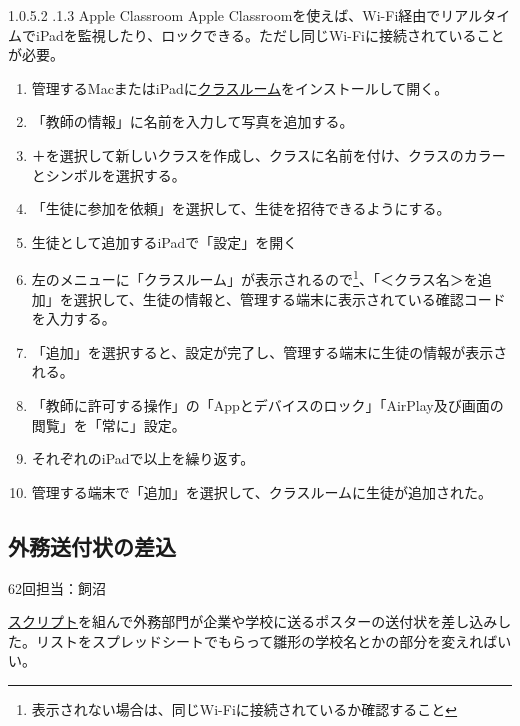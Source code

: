 \documentclass[dvipdfmx,jb5]{jarticle}
\makeatletter
\newcommand{\subsubsubsection}{\@startsection{paragraph}{4}{\z@}%
    {1.0\Cvs \@plus.5\Cdp \@minus.2\Cdp}%
    {.1\Cvs \@plus.3\Cdp}%
    {\large \bfseries}
  }
\newcommand{\link}[2]{\href{#2}{#1}}
\makeatother
\begin{document}
  \subsubsubsection{Apple Classroom}
  Apple Classroomを使えば、Wi-Fi経由でリアルタイムでiPadを監視したり、ロックできる。ただし同じWi-Fiに接続されていることが必要。
  \begin{enumerate}[手順1.]
   \item 管理するMacまたはiPadに\link{クラスルーム}{https://apple.co/3DShnKU}をインストールして開く。
   \item 「教師の情報」に名前を入力して写真を追加する。
   \item ＋を選択して新しいクラスを作成し、クラスに名前を付け、クラスのカラーとシンボルを選択する。
   \item 「生徒に参加を依頼」を選択して、生徒を招待できるようにする。
   \item 生徒として追加するiPadで「設定」を開く
   \item 左のメニューに「クラスルーム」が表示されるので\footnote{表示されない場合は、同じWi-Fiに接続されているか確認すること}、「＜クラス名＞を追加」を選択して、生徒の情報と、管理する端末に表示されている確認コードを入力する。
   \item 「追加」を選択すると、設定が完了し、管理する端末に生徒の情報が表示される。
   \item 「教師に許可する操作」の「Appとデバイスのロック」「AirPlay及び画面の閲覧」を「常に」設定。
   \item それぞれのiPadで以上を繰り返す。
   \item 管理する端末で「追加」を選択して、クラスルームに生徒が追加された。
  \end{enumerate}

\subsection{外務送付状の差込}\label{sec:外務送付状の差込}
62回担当：飼沼

\href{https://script.google.com/d/1peO_Bmf9jcnJWGCZMN2IRhBrCqokkgPmUVuC4BlryH9kxAiHoXzkjO_x/edit?usp=sharing}{スクリプト}を組んで外務部門が企業や学校に送るポスターの送付状を差し込みした。リストをスプレッドシートでもらって雛形の学校名とかの部分を変えればいい。
\end{document}
